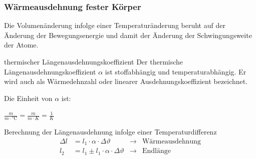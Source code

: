 \documentclass{beamer}
\begin{document}
\frame
{
  \frametitle{Wärmeausdehnung fester Körper}
  \begin{block}{}
  Die Volumenänderung infolge einer Temperaturänderung beruht auf der Änderung der Bewegungsenergie und damit der Änderung der Schwingungsweite der Atome.
  \end{block}
  \begin{block}{thermischer Längenausdehnungskoeffizient}
  Der thermische Längenausdehnungskoeffizient $\alpha$ ist stoffabhängig und temperaturabhängig. Er wird auch als Wärmedehnzahl oder linearer Ausdehnungskoeffizient bezeichnet.
  \end{block}
Die Einheit von $\alpha$ ist: 
	\begin{tcolorbox}	  
	  $\frac{m}{m\cdot \si{\celsius}} = \frac{m}{m\cdot K} = \frac{1}{K}$
	\end{tcolorbox}
}

\frame
{
	\begin{block}{Berechnung der Längenausdehnung infolge einer Temperaturdifferenz}
	\begin{align*}
	\Delta l&=l_1\cdot\alpha\cdot\Delta\vartheta &\rightarrow&\text{Wärmeausdehnung}\\
	l_2&=l_1\pm l_1\cdot\alpha\cdot\Delta\vartheta &\rightarrow&\text{Endlänge}
	\end{align*}
	\end{block}
	
}

\end{document}
